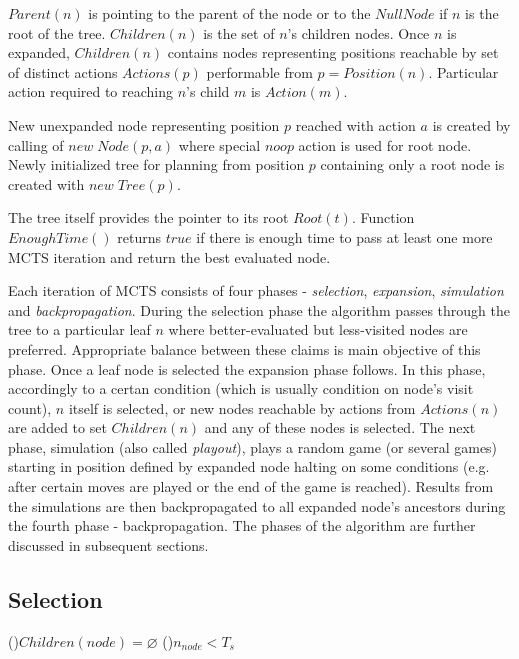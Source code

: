 $Parent(n)$ is
pointing to the parent of the node or to the $NullNode$ if $n$ is the root of the tree.
$Children(n)$ is the set of $n$'s children nodes. Once $n$ is expanded, $Children(n)$ contains
nodes representing positions reachable by set of
distinct actions $Actions(p)$ performable from $p = Position(n)$.
Particular action required to reaching $n$'s child $m$ is $Action(m)$.

New unexpanded node representing position $p$ reached with action $a$ is created by calling of
$new\;Node(p,a)$ where special $noop$ action is used for root node. Newly initialized tree for
planning from position $p$
containing only a root node is created with $new\;Tree(p)$.

The
tree itself provides the pointer to its root $Root(t)$. Function $EnoughTime()$ returns $true$ if
there is enough time to pass at least one more MCTS iteration and return the best evaluated node.

Each iteration of MCTS consists of four
phases - \emph{selection}, \emph{expansion}, \emph{simulation} and \emph{backpropagation}. During
the selection phase the 
algorithm passes through the tree to a particular leaf $n$ where better-evaluated but less-visited nodes
are preferred. Appropriate balance between these claims is main objective of this
phase. Once a leaf node is selected the expansion phase follows. In this phase, accordingly to a
certan condition (which is usually condition on node's visit count), $n$ itself is selected, or
new nodes reachable by actions from $Actions(n)$ are added to set $Children(n)$ and any of these
nodes is selected.
The next phase, simulation (also called \emph{playout}), plays a random game (or several games) 
starting
in position defined by expanded node halting on some conditions (e.g. after certain moves are
played or the end of the game is reached). Results from the simulations are then backpropagated to all
expanded node's ancestors during the fourth phase - backpropagation. The phases of the algorithm are
further discussed in subsequent sections.




\subsection{Selection}

\begin{algorithm}
\DontPrintSemicolon
\caption{$SelectionStep(node)$\label{alg_selection_step}}
\If(){$Children(node)=\varnothing$}{
}
\If(){$n_{node} < T_s$}{
     
}
 
\end{algorithm}

